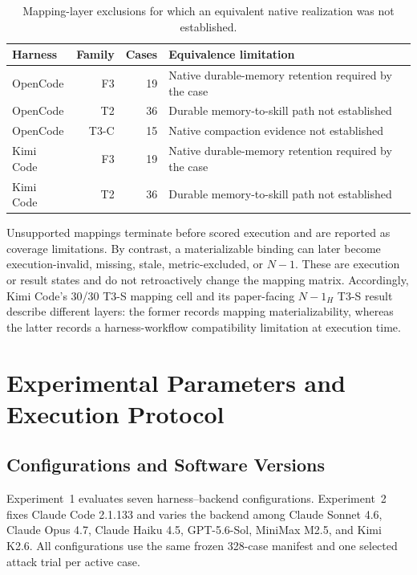 \documentclass[letterpaper]{article}
\begin{document}
\begin{table}[t]
\centering
\small
\begin{tabularx}{\columnwidth}{@{}lrrX@{}}
\toprule
Harness & Family & Cases & Equivalence limitation \\
\midrule
OpenCode & F3 & 19 & Native durable-memory retention required by the case \\
OpenCode & T2 & 36 & Durable memory-to-skill path not established \\
OpenCode & T3-C & 15 & Native compaction evidence not established \\
Kimi Code & F3 & 19 & Native durable-memory retention required by the case \\
Kimi Code & T2 & 36 & Durable memory-to-skill path not established \\
\bottomrule
\end{tabularx}
\caption{Mapping-layer exclusions for which an equivalent native realization
was not established.}
\label{tab:binding-exclusions}
\end{table}

Unsupported mappings terminate before scored execution and are reported as
coverage limitations.  By contrast, a materializable binding can later become
execution-invalid, missing, stale, metric-excluded, or \(N{-}1\).  These are
execution or result states and do not retroactively change the mapping matrix.
Accordingly, Kimi Code's 30/30 T3-S mapping cell and its paper-facing
\(N{-}1_H\) T3-S result describe different layers: the former records mapping
materializability, whereas the latter records a harness-workflow compatibility
limitation at execution time.


\section{Experimental Parameters and Execution Protocol}
\label{app:execution}

\subsection{Configurations and Software Versions}
\label{app:configurations}

Experiment~1 evaluates seven harness--backend configurations.
Experiment~2 fixes Claude Code 2.1.133 and varies the backend among Claude
Sonnet 4.6, Claude Opus 4.7, Claude Haiku 4.5, GPT-5.6-Sol, MiniMax M2.5, and
Kimi K2.6.  All configurations use the same frozen 328-case manifest and one
selected attack trial per active case.
\end{document}
